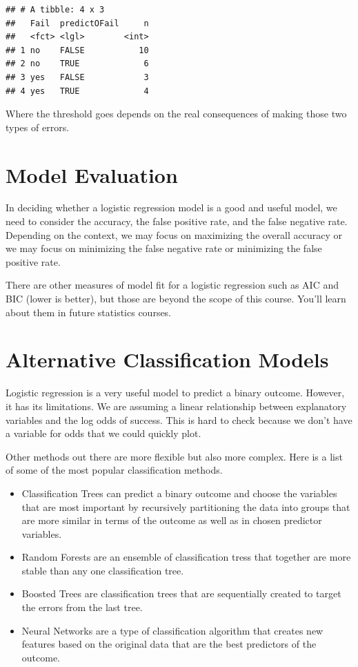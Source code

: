 \documentclass[]{book}
\begin{document}
\begin{verbatim}
## # A tibble: 4 x 3
##   Fail  predictOFail     n
##   <fct> <lgl>        <int>
## 1 no    FALSE           10
## 2 no    TRUE             6
## 3 yes   FALSE            3
## 4 yes   TRUE             4
\end{verbatim}

Where the threshold goes depends on the real consequences of making those two types of errors.

\hypertarget{model-evaluation-1}{%
\section{Model Evaluation}\label{model-evaluation-1}}

In deciding whether a logistic regression model is a good and useful model, we need to consider the accuracy, the false positive rate, and the false negative rate. Depending on the context, we may focus on maximizing the overall accuracy or we may focus on minimizing the false negative rate or minimizing the false positive rate.

There are other measures of model fit for a logistic regression such as AIC and BIC (lower is better), but those are beyond the scope of this course. You'll learn about them in future statistics courses.

\hypertarget{alternative-classification-models}{%
\section{Alternative Classification Models}\label{alternative-classification-models}}

Logistic regression is a very useful model to predict a binary outcome. However, it has its limitations. We are assuming a linear relationship between explanatory variables and the log odds of success. This is hard to check because we don't have a variable for odds that we could quickly plot.

Other methods out there are more flexible but also more complex. Here is a list of some of the most popular classification methods.

\begin{itemize}
\item
  Classification Trees can predict a binary outcome and choose the variables that are most important by recursively partitioning the data into groups that are more similar in terms of the outcome as well as in chosen predictor variables.
\item
  Random Forests are an ensemble of classification tress that together are more stable than any one classification tree.
\item
  Boosted Trees are classification trees that are sequentially created to target the errors from the last tree.
\item
  Neural Networks are a type of classification algorithm that creates new features based on the original data that are the best predictors of the outcome.
\end{itemize}
\end{document}
